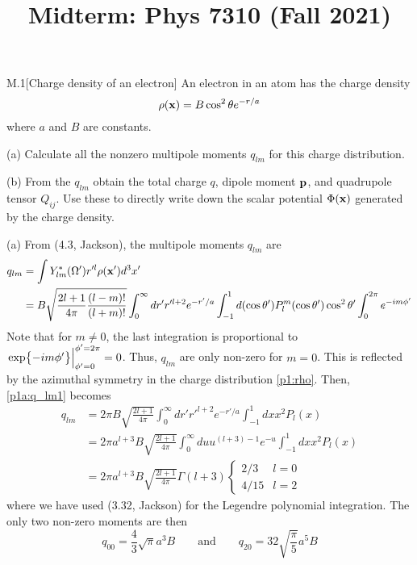 \documentclass[12pt]{article}
\title{Midterm: Phys 7310 (Fall 2021)}
\begin{document}
\maketitle
\begin{problem}{M.1}[Charge density of an electron]
An electron in an atom has the charge density
\begin{equation}\label{p1:rho}
    \rho(\vb{x})=B\cos^2\theta e^{-r/a} 
\end{equation}
where $a$ and $B$ are constants.

(a) Calculate all the nonzero multipole moments $q_{lm}$ for this charge
distribution.

(b) From the $q_{lm}$ obtain the total charge $q$, dipole moment $\vb{p}$, and
quadrupole tensor $Q_{ij}$. Use these to directly write down the scalar
potential $\Phi(\vb{x})$ generated by the charge density.
\begin{solution}
(a) From (4.3, Jackson), the multipole moments $q_{lm}$ are
\begin{align}\label{p1a:q_lm1}
    q_{lm}
    &=\int Y_{lm}^\ast(\Omega')r'^l\rho(\vb{x}')d^3x'\notag\\
    &=B\sqrt{\frac{2l+1}{4\pi}\frac{(l-m)!}{(l+m)!}}
    \int_0^\infty dr'r'^{l+2}e^{-r'/a}
    \int_{-1}^1d(\cos\theta')P_l^m(\cos\theta')\cos^2\theta'
    \int_0^{2\pi}e^{-im\phi'}
\end{align}
Note that for $m\neq 0$, the last integration is proportional to
$\eval{\exp{-im\phi'}}_{\phi'=0}^{\phi'=2\pi}=0$. Thus, $q_{lm}$ are only
non-zero for $m=0$. This is reflected by the azimuthal symmetry in the charge
distribution \eqref{p1:rho}. Then, \eqref{p1a:q_lm1} becomes
\begin{align}
    q_{lm}
    &=2\pi B\sqrt{\frac{2l+1}{4\pi}}\int_0^{\infty}dr'r'^{l+2}e^{-r'/a}
    \int_{-1}^1dxx^2P_l(x)\tag{$x=\cos\theta'$}\\
    &=2\pi a^{l+3}B\sqrt{\frac{2l+1}{4\pi}}\int_0^\infty du u^{(l+3)-1}e^{-u}
    \int_{-1}^1dx x^2P_l(x)\tag{$u=r'/a$}\\
    &=2\pi a^{l+3}B\sqrt{\frac{2l+1}{4\pi}}\Gamma(l+3)\begin{cases}
        2/3 & l=0\\
        4/15 & l=2
    \end{cases}
\end{align}
where we have used (3.32, Jackson) for the Legendre polynomial integration. The
only two non-zero moments are then
\begin{equation}
    q_{00}=\frac43\sqrt\pi a^3B
    \qquad\text{and}\qquad
    q_{20}=32\sqrt{\frac\pi5}a^5B
\end{equation}


\end{solution}
\end{problem}
\end{document}
